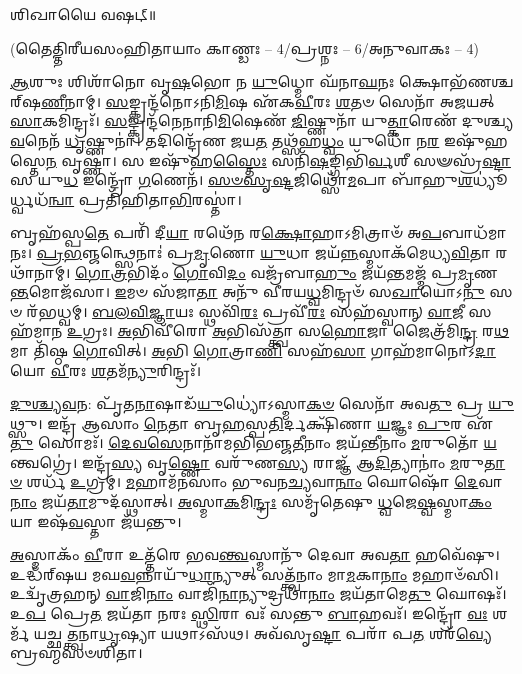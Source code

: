 𑌶𑌿𑌖𑌾𑌯𑍈 𑌵𑌷𑌟𑍍॥

{\small \closesection}
\centerline{\scriptsize (𑌤𑍈𑌤𑍍𑌤𑌿𑌰𑍀𑌯𑌸𑌂𑌹𑌿𑌤𑌾𑌯𑌾𑌂 𑌕𑌾𑌣𑍍𑌡𑌃 – 4/𑌪𑍍𑌰𑌶𑍍𑌨𑌃 – 6/𑌅𑌨𑍁𑌵𑌾𑌕𑌃 – 4)}

\-\ul{𑌆}\-𑌶𑍁𑌃 𑌶𑌿𑌶𑌾᳴𑌨𑍋 𑌵𑍃\-\ul{𑌷}\-𑌭𑍋 𑌨 \ul{𑌯𑍁}\-𑌧𑍍𑌮𑍋 𑌘᳴𑌨𑌾\-\ul{𑌘}\-𑌨𑌃 𑌕𑍍𑌷𑍋𑌭᳴𑌣𑌶𑍍𑌚𑌰𑍍‌𑌷\-\ul{𑌣𑍀}\-𑌨𑌾𑌮𑍍। \ul{𑌸}\-𑌙𑍍𑌕𑍍𑌰𑌨𑍍𑌦᳴𑌨𑍋𑌽𑌨𑌿\-\ul{𑌮𑌿}\-𑌷 𑌏᳴𑌕\-\ul{𑌵𑍀}\-𑌰𑌃 \ul{𑌶}\-𑌤𑍞 𑌸𑍇𑌨𑌾᳴ 𑌅𑌜𑌯𑌤𑍍 \ul{𑌸𑌾}\-𑌕𑌮𑌿𑌨𑍍𑌦𑍍𑌰𑌃᳴। \ul{𑌸}\-𑌙𑍍𑌕𑍍𑌰𑌨𑍍𑌦᳴𑌨𑍇𑌨𑌾𑌨𑌿\-\ul{𑌮𑌿}\-𑌷𑍇𑌣᳴ \ul{𑌜𑌿}\-𑌷𑍍𑌣𑍁𑌨𑌾᳴ 𑌯𑍁\-\ul{𑌤𑍍𑌕𑌾}\-𑌰𑍇𑌣᳴ 𑌦𑍁𑌶𑍍𑌚𑍍𑌯\-\ul{𑌵}\-𑌨𑍇𑌨᳴ \ul{𑌧𑍃}\-𑌷𑍍𑌣𑍁𑌨𑌾॑। 𑌤𑌦𑌿𑌨𑍍𑌦𑍍𑌰𑍇᳴𑌣 𑌜𑌯\-\ul{𑌤} 𑌤𑌥𑍍𑌸᳴𑌹\-\ul{𑌧𑍍𑌵𑌂} 𑌯𑍁𑌧𑍋᳴ 𑌨\-\ul{𑌰} 𑌇𑌷𑍁᳴𑌹𑌸𑍍𑌤𑍇\-\ul{𑌨} 𑌵𑍃𑌷𑍍𑌣𑌾॑। 𑌸 𑌇𑌷𑍁᳴𑌹\-\ul{𑌸𑍍𑌤𑍈𑌃} 𑌸𑌨𑌿᳴\-\ul{𑌷}\-𑌙𑍍𑌗𑌿𑌭𑌿᳴\-\ul{𑌰𑍍𑌵}\-𑌶𑍀 𑌸𑍟𑌸𑍍𑌰᳴\-\ul{𑌷𑍍𑌟𑌾} 𑌸 𑌯𑍁\-\ul{𑌧} 𑌇𑌨𑍍𑌦𑍍𑌰𑍋᳴ \ul{𑌗}\-𑌣𑍇𑌨᳴। \ul{𑌸}\-\-\ul{𑍞}\-\-\ul{𑌸𑍃}\-\-\ul{𑌷𑍍𑌟}\-𑌜𑌿𑌥𑍍𑌸𑍋᳴\-\ul{𑌮}\-𑌪𑌾 𑌬𑌾᳴𑌹𑍁\-\ul{𑌶}\-𑌧𑍍𑌯𑍂॑𑌰𑍍𑌧𑍍𑌵𑌧᳴\-\ul{𑌨𑍍𑌵𑌾} 𑌪𑍍𑌰𑌤𑌿᳴𑌹𑌿𑌤𑌾\-\ul{𑌭𑌿}\-𑌰𑌸𑍍𑌤𑌾॑।

𑌬𑍃𑌹᳴𑌸𑍍𑌪\-\ul{𑌤𑍇} 𑌪𑌰𑌿᳴ 𑌦𑍀\-\ul{𑌯𑌾} 𑌰𑌥𑍇᳴𑌨 𑌰\-\ul{𑌕𑍍𑌷𑍋}\-𑌹𑌾𑌽𑌮𑌿𑌤𑍍𑌰𑌾𑍞᳴ 𑌅\-\ul{𑌪}\-𑌬𑌾𑌧᳴𑌮𑌾𑌨𑌃। \ul{𑌪𑍍𑌰}\-\-\ul{𑌭}\-𑌞𑍍𑌜𑌨𑍍𑌥𑍍𑌸𑍇𑌨𑌾𑌃॑ 𑌪𑍍𑌰\-\ul{𑌮𑍃}\-𑌣𑍋 \ul{𑌯𑍁}\-𑌧𑌾 𑌜𑌯᳴\-\ul{𑌨𑍍𑌨}\-𑌸𑍍𑌮𑌾𑌕᳴𑌮𑍇𑌧𑍍𑌯\-\ul{𑌵𑌿}\-𑌤𑌾 𑌰𑌥𑌾᳴𑌨𑌾𑌮𑍍। \ul{𑌗𑍋}\-\-\ul{𑌤𑍍𑌰}\-𑌭𑌿𑌦𑌂᳴ \ul{𑌗𑍋}\-𑌵𑌿\-\ul{𑌦𑌂} 𑌵𑌜𑍍𑌰᳴𑌬𑌾\-\ul{𑌹𑍁𑌂} 𑌜𑌯᳴\-\ul{𑌨𑍍𑌤}\-𑌮𑌜𑍍𑌮᳴ 𑌪𑍍𑌰\-\ul{𑌮𑍃}\-𑌣\-\ul{𑌨𑍍𑌤}\-𑌮𑍋𑌜᳴𑌸𑌾। \ul{𑌇}\-𑌮𑍞 𑌸᳴𑌜𑌾\-\ul{𑌤𑌾} 𑌅𑌨𑍁᳴ 𑌵𑍀𑌰𑌯\-\ul{𑌧𑍍𑌵}\-𑌮𑌿𑌨𑍍𑌦𑍍𑌰𑍞᳴ 𑌸\-\ul{𑌖𑌾}\-𑌯𑍋𑌽\-\ul{𑌨𑍁} 𑌸𑍞 𑌰᳴𑌭𑌧𑍍𑌵𑌮𑍍। \ul{𑌬}\-\-\ul{𑌲}\-\-\ul{𑌵𑌿}\-\-\ul{𑌜𑍍𑌞𑌾}\-𑌯𑌃 𑌸𑍍𑌥𑌵𑌿᳴\-\ul{𑌰𑌃} 𑌪𑍍𑌰𑌵𑍀᳴\-\ul{𑌰𑌃} 𑌸𑌹᳴𑌸𑍍𑌵𑌾𑌨𑍍 \ul{𑌵𑌾}\-𑌜𑍀 𑌸𑌹᳴𑌮𑌾𑌨 \ul{𑌉}\-𑌗𑍍𑌰𑌃। \ul{𑌅}\-𑌭𑌿𑌵𑍀᳴𑌰𑍋 \ul{𑌅}\-𑌭𑌿𑌸᳴𑌤𑍍𑌤𑍍𑌵𑌾 𑌸\-\ul{𑌹𑍋}\-𑌜𑌾 𑌜𑍈𑌤𑍍𑌰᳴𑌮𑌿\-\ul{𑌨𑍍𑌦𑍍𑌰} 𑌰\-\ul{𑌥}\-𑌮𑌾 𑌤𑌿᳴𑌷𑍍𑌠 \ul{𑌗𑍋}\-𑌵𑌿𑌤𑍍। \ul{𑌅}\-𑌭𑌿 \ul{𑌗𑍋}\-𑌤𑍍𑌰𑌾\-\ul{𑌣𑌿} 𑌸𑌹᳴\-\ul{𑌸𑌾} 𑌗𑌾𑌹᳴𑌮𑌾𑌨𑍋𑌽\-\ul{𑌦𑌾}\-𑌯𑍋 \ul{𑌵𑍀}\-𑌰𑌃 \ul{𑌶}\-𑌤𑌮᳴\-\ul{𑌨𑍍𑌯𑍁}\-𑌰𑌿𑌨𑍍𑌦𑍍𑌰𑌃᳴।

\-\ul{𑌦𑍁}\-\-\ul{𑌶𑍍𑌚𑍍𑌯}\-\-\ul{𑌵}\-𑌨: 𑌪𑍃᳴𑌤\-\ul{𑌨𑌾}\-𑌷𑌾𑌡᳴\-\ul{𑌯𑍁}\-𑌧𑍍𑌯𑍋॑𑌽𑌸𑍍𑌮𑌾\-\ul{𑌕}\-\-\ul{𑍞} 𑌸𑍇𑌨𑌾᳴ 𑌅𑌵\-\ul{𑌤𑍁} 𑌪𑍍𑌰 \ul{𑌯𑍁}\-𑌥𑍍𑌸𑍁। 𑌇𑌨𑍍𑌦𑍍𑌰᳴ 𑌆𑌸𑌾𑌂 \ul{𑌨𑍇}\-𑌤𑌾 𑌬𑍃\-\ul{𑌹}\-𑌸𑍍𑌪\-\ul{𑌤𑌿}\-𑌰𑍍𑌦𑌕𑍍𑌷𑌿᳴𑌣𑌾 \ul{𑌯}\-𑌜𑍍𑌞𑌃 \ul{𑌪𑍁}\-𑌰 𑌏᳴\-\ul{𑌤𑍁} 𑌸𑍋𑌮𑌃᳴। \ul{𑌦𑍇}\-\-\ul{𑌵}\-\-\ul{𑌸𑍇}\-𑌨𑌾𑌨𑌾᳴𑌮𑌭𑌿𑌭𑌞𑍍𑌜\-\ul{𑌤𑍀}\-𑌨𑌾𑌂 𑌜𑌯᳴𑌨𑍍𑌤𑍀𑌨𑌾𑌂 \ul{𑌮}\-𑌰𑍁𑌤𑍋᳴ \ul{𑌯}\-𑌨𑍍𑌤𑍍𑌵𑌗𑍍𑌰𑍇॑। 𑌇𑌨𑍍𑌦𑍍𑌰᳴\-\ul{𑌸𑍍𑌯} 𑌵𑍃\-\ul{𑌷𑍍𑌣𑍋} 𑌵𑌰𑍁᳴𑌣\-\ul{𑌸𑍍𑌯} 𑌰𑌾𑌜𑍍𑌞᳴ 𑌆\-\ul{𑌦𑌿}\-𑌤𑍍𑌯𑌾𑌨𑌾𑌂॑ \ul{𑌮}\-𑌰𑍁\-\ul{𑌤𑌾}\-\-\ul{𑍞} 𑌶𑌰𑍍𑌧᳴ \ul{𑌉}\-𑌗𑍍𑌰𑌮𑍍। \ul{𑌮}\-𑌹𑌾𑌮᳴𑌨𑌸𑌾𑌂 𑌭𑍁𑌵𑌨\-\ul{𑌚𑍍𑌯}\-𑌵𑌾\-\ul{𑌨𑌾𑌂} 𑌘𑍋𑌷𑍋᳴ \ul{𑌦𑍇}\-𑌵𑌾\-\ul{𑌨𑌾𑌂} 𑌜𑌯᳴\-\ul{𑌤𑌾}\-𑌮𑍁𑌦᳴𑌸𑍍𑌥𑌾𑌤𑍍। \ul{𑌅}\-𑌸𑍍𑌮𑌾\-\ul{𑌕}\-𑌮𑌿\-\ul{𑌨𑍍𑌦𑍍𑌰𑌃} 𑌸𑌮𑍃᳴𑌤𑍇𑌷𑍁 \ul{𑌧𑍍𑌵}\-𑌜𑍇\-\ul{𑌷𑍍𑌵}\-𑌸𑍍𑌮𑌾\-\ul{𑌕𑌂} 𑌯𑌾 𑌇𑌷᳴\-\ul{𑌵}\-𑌸𑍍𑌤𑌾 𑌜᳴𑌯𑌨𑍍𑌤𑍁।

\-\ul{𑌅}\-𑌸𑍍𑌮𑌾𑌕𑌂᳴ \ul{𑌵𑍀}\-𑌰𑌾 𑌉𑌤𑍍𑌤᳴𑌰𑍇 𑌭𑌵\-\ul{𑌨𑍍𑌤𑍍𑌵}\-𑌸𑍍𑌮𑌾𑌨𑍁᳴ 𑌦𑍇𑌵𑌾 𑌅𑌵\-\ul{𑌤𑌾} 𑌹𑌵𑍇᳴𑌷𑍁। 𑌉𑌦𑍍𑌧᳴𑌰𑍍‌𑌷𑌯 𑌮𑌘\-\ul{𑌵}\-𑌨𑍍𑌨𑌾𑌯𑍁᳴\-\ul{𑌧𑌾}\-𑌨𑍍𑌯𑍁𑌤𑍍 𑌸𑌤𑍍𑌤𑍍𑌵᳴𑌨𑌾𑌂 𑌮𑌾\-\ul{𑌮}\-𑌕𑌾\-\ul{𑌨𑌾𑌂} 𑌮𑌹𑌾𑍞᳴𑌸𑌿। 𑌉𑌦𑍍𑌵𑍃᳴𑌤𑍍𑌰𑌹𑌨𑍍 \ul{𑌵𑌾}\-𑌜𑌿\-\ul{𑌨𑌾𑌂} 𑌵𑌾𑌜𑌿᳴\-\ul{𑌨𑌾}\-𑌨𑍍𑌯𑍁𑌦𑍍𑌰𑌥𑌾᳴\-\ul{𑌨𑌾𑌂} 𑌜𑌯᳴𑌤𑌾𑌮𑍇\-\ul{𑌤𑍁} 𑌘𑍋𑌷𑌃᳴। 𑌉\-\ul{𑌪} 𑌪𑍍𑌰𑍇\-\ul{𑌤} 𑌜𑌯᳴𑌤𑌾 𑌨𑌰𑌃 \ul{𑌸𑍍𑌥𑌿}\-𑌰𑌾 𑌵𑌃᳴ 𑌸𑌨𑍍𑌤𑍁 \ul{𑌬𑌾}\-𑌹𑌵𑌃᳴। 𑌇𑌨𑍍𑌦𑍍𑌰𑍋᳴ \ul{𑌵𑌃} 𑌶𑌰𑍍𑌮᳴ 𑌯𑌚𑍍𑌛𑌤𑍍𑌤𑍍𑌵𑌨𑌾\-\ul{𑌧𑍃}\-𑌷𑍍𑌯𑌾 𑌯𑌥𑌾𑌽𑌸᳴𑌥। 𑌅𑌵᳴𑌸𑍃\-\ul{𑌷𑍍𑌟𑌾} 𑌪𑌰𑌾᳴ 𑌪\-\ul{𑌤} 𑌶𑌰᳴\-\ul{𑌵𑍍𑌯𑍇} 𑌬𑍍𑌰𑌹𑍍𑌮᳴𑌸𑍞𑌶𑌿𑌤𑌾।

